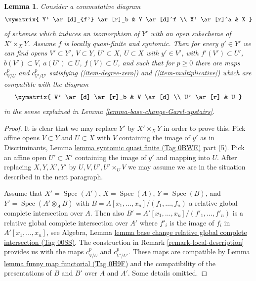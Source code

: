 \documentclass{amsart}
\theoremstyle{plain}
\newtheorem{lemma}[subsection]{Lemma}
\theoremstyle{definition}
\theoremstyle{remark}
\numberwithin{equation}{subsection}
\def\Spec{\mathop{\mathrm{Spec}}}
\begin{document}
\begin{lemma}
\label{lemma-existence-base-change-Garel-upstairs}
Consider a commutative diagram
$$
\xymatrix{
Y' \ar[d]_{f'} \ar[r]_b & Y \ar[d]^f \\
X' \ar[r]^a & X
}
$$
of schemes which induces an isomorphism of $Y'$ with an open subscheme of
$X' \times_X Y$. Assume $f$ is locally quasi-finite and syntomic. Then for
every $y' \in Y'$ we can find opens $V' \subset Y'$,
$V \subset Y$, $U' \subset X$, $U \subset X$ with $y' \in V'$, with
$f'(V') \subset U'$, $b(V') \subset V$, $a(U') \subset U$,
$f(V) \subset U$, and such that for $p \geq 0$ there are maps
$c^p_{V/U}$ and $c^p_{V'/U'}$ satisfying (\ref{item-degree-zero})
and (\ref{item-multiplicative}) which are compatible with the diagram
$$
\xymatrix{
V' \ar[d] \ar[r]_b & V \ar[d] \\
U' \ar[r] & U
}
$$
in the sense explained in Lemma \ref{lemma-base-change-Garel-upstairs}.
\end{lemma}

\begin{proof}
It is clear that we may replace $Y'$ by $X' \times_X Y$ in order to prove this.
Pick affine opens $V \subset Y$ and $U \subset X$ with $V$ containing
the image of $y'$ as in
Discriminants, Lemma \href{https://stacks.math.columbia.edu/tag/0BWE}{lemma syntomic quasi finite (Tag 0BWE)} part (5).
Pick an affine open $U' \subset X'$ containing the image of $y'$
and mapping into $U$. After replacing $X, Y, X', Y'$ by
$U, V, U', U' \times_U V$ we may assume we are in the situation
described in the next paragraph.

\medskip\noindent
Assume that $X' = \Spec(A')$, $X = \Spec(A)$, $Y = \Spec(B)$, and
$Y' = \Spec(A' \otimes_A B)$ with $B = A[x_1, \ldots, x_n]/(f_1, \ldots, f_n)$
a relative global complete intersection over $A$. Then also
$B' = A'[x_1, \ldots, x_n]/(f'_1, \ldots, f'_n)$ is a relative
global complete intersection over $A'$ where $f'_i$ is the image of $f_i$
in $A'[x_1, \ldots, x_n]$, see Algebra, Lemma
\href{https://stacks.math.columbia.edu/tag/00SS}{lemma base change relative global complete intersection (Tag 00SS)}.
The construction in Remark \ref{remark-local-description}
provides us with the maps $c^p_{V/U}$ and $c^p_{V'/U'}$.
These maps are compatible by Lemma \href{https://stacks.math.columbia.edu/tag/0H9F}{lemma funny map functorial (Tag 0H9F)}
and the compatibility of the presentations of $B$ and $B'$ over
$A$ and $A'$. Some details omitted.
\end{proof}
\end{document}
